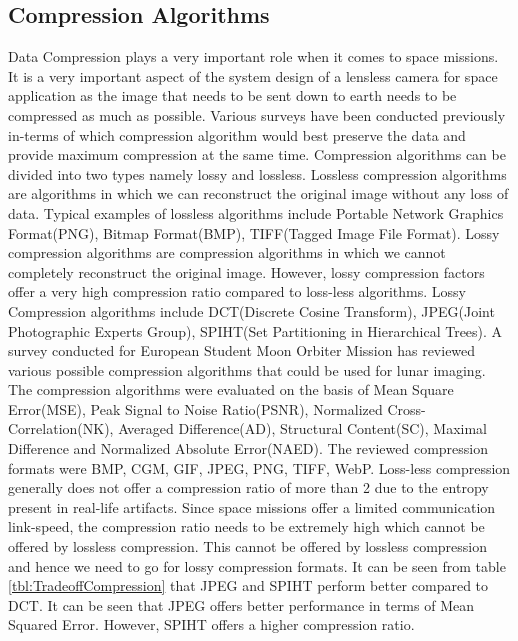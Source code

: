 \subsection{Compression Algorithms}
Data Compression plays a very important role when it comes to space missions. It is a very important aspect of the system design of a lensless camera for space application as the image that needs to be sent down to earth needs to be compressed as much as possible. Various surveys\cite{Compression2}\cite{Compression3}\cite{Compression4} have been conducted previously in-terms of which compression algorithm would best preserve the data and provide maximum compression at the same time. Compression algorithms can be divided into two types namely lossy and lossless. Lossless compression algorithms are algorithms in which we can reconstruct the original image without any loss of data. Typical examples of lossless algorithms include Portable Network Graphics Format(PNG), Bitmap Format(BMP), TIFF(Tagged Image File Format). Lossy compression algorithms are compression algorithms in which we cannot completely reconstruct the original image. However, lossy compression factors offer a very high compression ratio compared to loss-less algorithms. Lossy Compression algorithms include DCT(Discrete Cosine Transform), JPEG(Joint Photographic Experts Group), SPIHT(Set Partitioning in Hierarchical Trees)\cite{Compression3}. A survey conducted for European Student Moon Orbiter Mission\cite{Compression3} has reviewed various possible compression algorithms that could be used for lunar imaging. The compression algorithms were evaluated on the basis of Mean Square Error(MSE), Peak Signal to Noise Ratio(PSNR), Normalized Cross-Correlation(NK), Averaged Difference(AD), Structural Content(SC), Maximal Difference and Normalized Absolute Error(NAED). The reviewed compression formats were BMP, CGM, GIF, JPEG, PNG, TIFF, WebP. Loss-less compression generally does not offer a compression ratio of more than 2 due to the entropy present in real-life artifacts. Since space missions offer a limited communication link-speed, the compression ratio needs to be extremely high which cannot be offered by lossless compression. This cannot be offered by lossless compression and hence we need to go for lossy compression formats. It can be seen from table \ref{tbl:TradeoffCompression} that JPEG and SPIHT perform better compared to DCT. It can be seen that JPEG offers better performance in terms of Mean Squared Error. However, SPIHT offers a higher compression ratio. 

